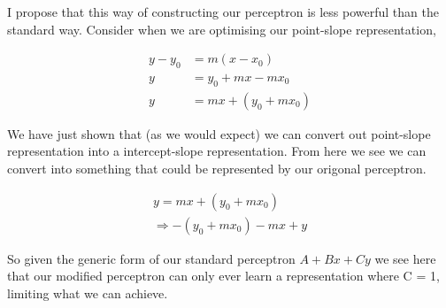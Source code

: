 \documentclass{article}
\begin{document}
I propose that this way of constructing our perceptron is less powerful than the standard way. Consider when we are optimising our point-slope representation, 

\begin{align*}
y - y_0 &= m(x - x_0) \\
y &= y_0 + mx - mx_0 \\
y &= mx + (y_0 + mx_0)
\end{align*}

We have just shown that (as we would expect) we can convert out point-slope representation into a intercept-slope representation. From here we see we can convert into something that could be represented by our origonal perceptron.

\begin{align*}
y = mx + (y_0 + mx_0)\\
\Rightarrow -(y_0 + mx_0) -mx + y
\end{align*}

So given the generic form of our standard perceptron $A + Bx + Cy$ we see here that our modified perceptron can only ever learn a representation where C = 1, limiting what we can achieve.
\end{document}
